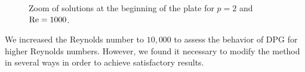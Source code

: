 \begin{figure}
\caption{Zoom of solutions at the beginning of the plate for $p=2$ and $\Reyn = 1000$.}
\label{fig:Re1000_zoom} 
\end{figure}

We increased the Reynolds number to $10,000$ to assess the behavior of DPG for higher Reynolds numbers.  However, we found it necessary to modify the method in several ways in order to achieve satisfactory results.  

